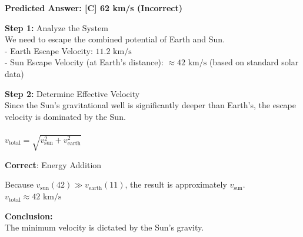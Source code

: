 \begin{minipage}{\linewidth}
\begin{tcolorbox}[
    title={\small\textbf{JEE Advanced 2017 Paper 2}},
    colback=white,
    colframe=gray!50!black,
    arc=3pt,
    boxrule=1pt,
    fonttitle=\sffamily\large,
    width=\linewidth
]
\begin{minipage}[t]{0.49\linewidth}
\begin{tcolorbox}
            \textbf{Predicted Answer: [C] 62 km/s (Incorrect)}
        \end{tcolorbox}
    \end{minipage}%
    \hfill
    \begin{minipage}[t]{0.49\linewidth}
        \vspace{0pt} 
        \begin{tcolorbox}[
            title={\scriptsize \textbf{RL-FINETUNED MODEL}},
            colframe=green!50!black,
            colback=green!5!white,
            coltitle=white,
            fontupper=\scriptsize\ttfamily\raggedright,
            boxrule=0.5pt,
            sharp corners,
            left=2pt, right=2pt,
            width=\linewidth,
            nobeforeafter 
        ]
            \textbf{\textcolor{green!40!black}{Step 1:}} Analyze the System\\
            We need to escape the combined potential of Earth and Sun.\\
            - Earth Escape Velocity: $11.2\text{ km/s}$\\
            - Sun Escape Velocity (at Earth's distance): $\approx 42\text{ km/s}$ (based on standard solar data)
            \vspace{1em}
            
            \textbf{\textcolor{green!40!black}{Step 2:}} Determine Effective Velocity\\
            Since the Sun's gravitational well is significantly deeper than Earth's, the escape velocity is dominated by the Sun.\\\\
            $v_{\text{total}} = \sqrt{v_{\text{sun}}^2 + v_{\text{earth}}^2}$
            \vspace{0.5em}

            \vspace{0.3em}
            \colorbox{green!15}{\textcolor{green!80!black}{\textbf{Correct}:}}
            \colorbox{green!15}{\textcolor{green!80!black}{Energy Addition}}
            \vspace{0.3em}
            
            Because $v_{\text{sun}} (42) \gg v_{\text{earth}} (11)$, the result is approximately $v_{\text{sun}}$.\\
            $v_{\text{total}} \approx 42\text{ km/s}$
            \vspace{1em}
            
            \textbf{Conclusion:}\\
            The minimum velocity is dictated by the Sun's gravity.
            \vspace{1em}
            

\end{tcolorbox}
\end{minipage}
\end{tcolorbox}
\end{minipage}
